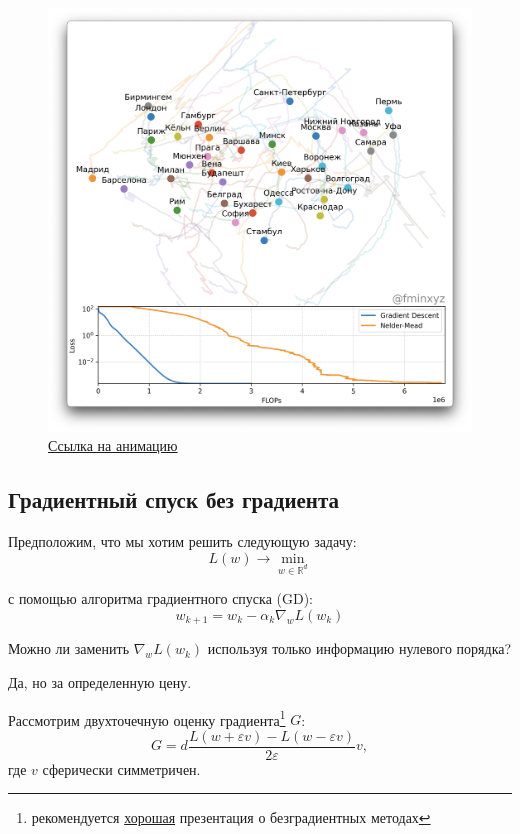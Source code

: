 \documentclass[
  russian,
  letterpaper,
  DIV=11,
  numbers=noendperiod]{scrartcl}
\begin{document}
\begin{figure}[H]

{\centering \includegraphics[width=0.4\linewidth,height=\textheight,keepaspectratio]{mds.png}

}

\caption{\href{https://fmin.xyz/docs/visualizations/mds.mp4}{Ссылка на
анимацию}}

\end{figure}%

\subsection{Градиентный спуск без
градиента}\label{ux433ux440ux430ux434ux438ux435ux43dux442ux43dux44bux439-ux441ux43fux443ux441ux43a-ux431ux435ux437-ux433ux440ux430ux434ux438ux435ux43dux442ux430}

Предположим, что мы хотим решить следующую задачу: \[
L(w) \to \min_{w \in \mathbb{R}^d}
\]

с помощью алгоритма градиентного спуска (GD): \[
w_{k+1} = w_k - \alpha_k \nabla_w L(w_k)
\]

Можно ли заменить \(\nabla_w L(w_k)\) используя только информацию
нулевого порядка?

Да, но за определенную цену.

Рассмотрим двухточечную оценку градиента\footnote{рекомендуется
  \href{https://scholar.harvard.edu/files/yujietang/files/slides_2019_zero-order_opt_tutorial.pdf}{хорошая}
  презентация о безградиентных методах} \(G\): \[
G = d\dfrac{L(w + \varepsilon v)- L(w - \varepsilon v)}{2 \varepsilon}v, 
\] где \(v\) сферически симметричен.
\end{document}

